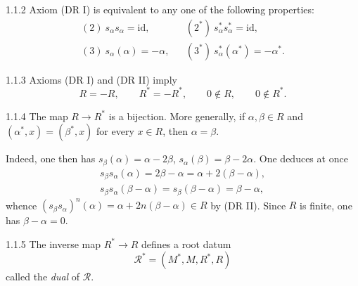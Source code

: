 \begin{remark}{1.1.2}\label{XXI.1.1.2}
Axiom (DR I) is equivalent to any one of the following properties:
\[
\begin{array}{lll}
(2)\ s_\alpha s_\alpha=\mathrm{id},&&(2^*)\ s_\alpha^*s_\alpha^*=\mathrm{id},\\
(3)\ s_\alpha(\alpha)=-\alpha,&&(3^*)\ s_\alpha^*(\alpha^*)=-\alpha^*.
\end{array}
\]
\end{remark}
\begin{remark}{1.1.3}\label{XXI.1.1.3}
Axioms (DR I) and (DR II) imply
\[
R=-R,\qquad R^*=-R^*,\qquad0\notin R,\qquad0\notin R^*.
\]
\end{remark}
\begin{lemma}{1.1.4}\label{XXI.1.1.4}
The map $R\to R^*$ is a bijection. More generally, if $\alpha,\beta\in R$ and $(\alpha^*,x)=(\beta^*,x)$ for every $x\in R$, then $\alpha=\beta$.
\end{lemma}
Indeed, one then has $s_\beta(\alpha)=\alpha-2\beta$, $s_\alpha(\beta)=\beta-2\alpha$. One deduces at once
\[
\begin{gathered}
s_\beta s_\alpha(\alpha)=2\beta-\alpha=\alpha+2(\beta-\alpha),\\
s_\beta s_\alpha(\beta-\alpha)=s_\beta(\beta-\alpha)=\beta-\alpha,
\end{gathered}
\]
whence $(s_\beta s_\alpha)^n(\alpha)=\alpha+2n(\beta-\alpha)\in R$ by (DR II). Since $R$ is finite, one has $\beta-\alpha=0$.

\begin{corollary}{1.1.5}\label{XXI.1.1.5}
The inverse map $R^*\to R$ defines a root datum
\[
\mathcal R^*=(M^*,M,R^*,R)
\]
called the \emph{dual} of $\mathcal R$.{\renewcommand{\thefootnote}{(2)}}
\end{corollary}

